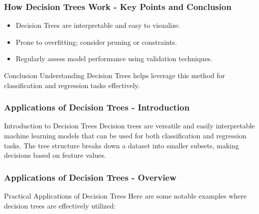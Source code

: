 \documentclass[aspectratio=169]{beamer}
\begin{document}
\begin{frame}[fragile]
    \frametitle{How Decision Trees Work - Key Points and Conclusion}
    \begin{itemize}
        \item Decision Trees are interpretable and easy to visualize.
        \item Prone to overfitting; consider pruning or constraints.
        \item Regularly assess model performance using validation techniques.
    \end{itemize}
    \begin{block}{Conclusion}
        Understanding Decision Trees helps leverage this method for classification and regression tasks effectively.
    \end{block}
\end{frame}

\begin{frame}[fragile]
  \frametitle{Applications of Decision Trees - Introduction}
  \begin{block}{Introduction to Decision Trees}
    Decision trees are versatile and easily interpretable machine learning models that can be used for both classification and regression tasks. 
    The tree structure breaks down a dataset into smaller subsets, making decisions based on feature values.
  \end{block}
\end{frame}

\begin{frame}[fragile]
  \frametitle{Applications of Decision Trees - Overview}
  \begin{block}{Practical Applications of Decision Trees}
    Here are some notable examples where decision trees are effectively utilized:
  \end{block}
\end{frame}
\end{document}
